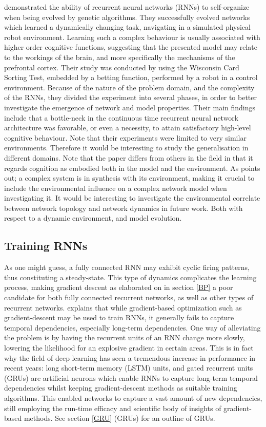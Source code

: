 \cite{Maniadakis2012} demonstrated the ability of recurrent neural networks (RNNs) to self-organize when being evolved by genetic algorithms. They successfully evolved networks which learned a dynamically changing task, navigating in a simulated physical robot environment. Learning such a complex behaviour is usually associated with higher order cognitive functions, suggesting that the presented model may relate to the workings of the brain, and more specifically the mechanisms of the prefrontal cortex.
Their study was conducted by using the Wisconsin Card Sorting Test, embedded by a betting function, performed by a robot in a control environment. Because of the nature of the problem domain, and the complexity of the RNNs, they divided the experiment into several phases, in order to better investigate the emergence of network and model properties. Their main findings include that a bottle-neck in the continuous time recurrent neural network architecture was favorable, or even a necessity, to attain satisfactory high-level cognitive behaviour. Note that their experiments were limited to very similar environments. Therefore it would be interesting to study the generalisation in different domains. Note that the paper differs from others in the field in that it regards cognition as embodied both in the model and the environment. As \cite{Bar-yam1997} points out; a complex system is in synthesis with its environment, making it crucial to include the environmental influence on a complex network model when investigating it. It would be interesting to investigate the environmental correlate between network topology and network dynamics in future work. Both with respect to a dynamic environment, and model evolution.

\subsection{Training RNNs}

As one might guess, a fully connected RNN may exhibit cyclic firing patterns, thus constituting a steady-state. This type of dynamics complicates the learning process, making gradient descent as elaborated on in section \ref{BP} a poor candidate for both fully connected recurrent networks, as well as other types of recurrent networks. \cite{Bengio2013b} explains that while gradient-based optimization such as gradient-descent may be used to train RNNs, it generally fails to capture temporal dependencies, especially long-term dependencies. One way of alleviating the problem is by having the recurrent units of an RNN change more slowly, lowering the likelihood for an explosive gradient in certain areas. This is in fact why the field of deep learning has seen a tremendous increase in performance in recent years: long short-term memory (LSTM) units, and gated recurrent units (GRUs) are artificial neurons which enable RNNs to capture long-term temporal dependencies whilst keeping gradient-descent methods as suitable training algorithms. This enabled networks to capture a vast amount of new dependencies, still employing the run-time efficacy and scientific body of insights of gradient-based methods. See section \ref{GRU} (GRUs) for an outline of GRUs.

